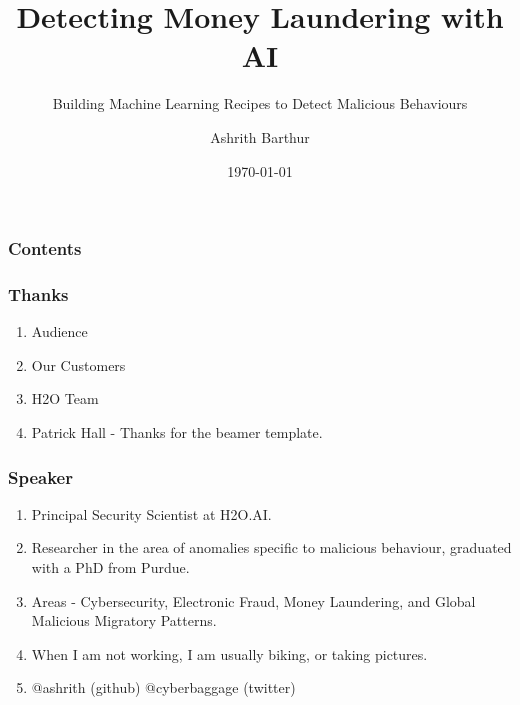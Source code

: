 \documentclass[11pt,
               aspectratio=169,
               hyperref={colorlinks}
               ]{beamer}
\author{Ashrith Barthur}
\title{Detecting Money Laundering with AI}
\subtitle{Building Machine Learning Recipes to Detect Malicious Behaviours}
\institute{\href{https://www.h2o.ai}{H\textsubscript{2}O.ai}}
\date{\today}
\begin{document}
	
	\maketitle
	
	\begin{frame}
	
		\frametitle{Contents}
		
		\tableofcontents{}
		
	\end{frame}

	\begin{frame}
		\frametitle{Thanks}
		\begin{enumerate}
			\item Audience
			\item Our Customers
			\item H2O Team
			\item Patrick Hall - Thanks for the beamer template.
		\end{enumerate}
	\end{frame}

	\begin{frame}
		\frametitle{Speaker}
		\begin{enumerate}
			\item Principal Security Scientist at H2O.AI.
			\item Researcher in the area of anomalies specific to malicious behaviour, graduated with a PhD from Purdue. 
			\item Areas -  Cybersecurity, Electronic Fraud, Money Laundering, and Global Malicious Migratory Patterns.
			\item When I am not working, I am usually biking, or taking pictures. 
			\item @ashrith (github) @cyberbaggage (twitter)
		\end{enumerate}
	\end{frame}
\end{document}
